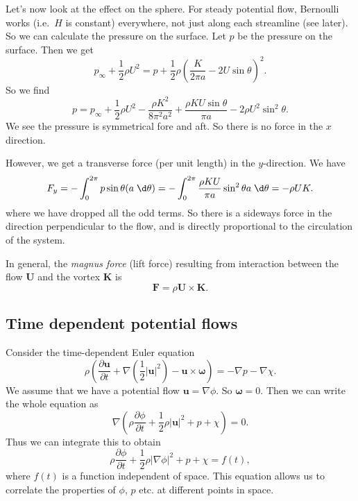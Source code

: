 \documentclass[a4paper]{article}
\begin{document}
\begin{eg}
\begin{center}
  \end{center}
  Let's now look at the effect on the sphere. For steady potential flow, Bernoulli works (i.e.\ $H$ is constant) everywhere, not just along each streamline (see later). So we can calculate the pressure on the surface. Let $p$ be the pressure on the surface. Then we get
  \[
    p_\infty + \frac{1}{2} \rho U^2 = p + \frac{1}{2} \rho \left(\frac{K}{2\pi a} - 2U \sin \theta\right)^2.
  \]
  So we find
  \[
    p = p_\infty + \frac{1}{2} \rho U^2 - \frac{\rho K^2}{8 \pi^2 a^2} + \frac{\rho KU \sin \theta}{\pi a} - 2\rho U^2 \sin^2 \theta.
  \]
  We see the pressure is symmetrical fore and aft. So there is no force in the $x$ direction.

  However, we get a transverse force (per unit length) in the $y$-direction. We have
  \[
    F_y = -\int_0^{2\pi} p \sin \theta (a \;\d \theta) = -\int_0^{2\pi} \frac{\rho K U}{\pi a} \sin^2 \theta a \;\d \theta = - \rho UK.
  \]
  where we have dropped all the odd terms. So there is a sideways force in the direction perpendicular to the flow, and is directly proportional to the circulation of the system.

  In general, the \emph{magnus force} (lift force) resulting from interaction between the flow $\mathbf{U}$ and the vortex $\mathbf{K}$ is
  \[
    \mathbf{F} = \rho \mathbf{U}\times \mathbf{K}.
  \]
\end{eg}
\subsection{Time dependent potential flows}
Consider the time-dependent Euler equation
\[
  \rho\left(\frac{\partial \mathbf{u}}{\partial t} + \nabla\left(\frac{1}{2}|\mathbf{u}|^2\right) - \mathbf{u}\times \boldsymbol\omega\right) = -\nabla p - \nabla \chi.
\]
We assume that we have a potential flow $\mathbf{u} = \nabla \phi$. So $\boldsymbol\omega = 0$. Then we can write the whole equation as
\[
  \nabla \left(\rho \frac{\partial \phi}{\partial t} + \frac{1}{2} \rho |\mathbf{u}|^2 + p + \chi\right) = 0.
\]
Thus we can integrate this to obtain
\[
  \rho \frac{\partial\phi}{\partial t} + \frac{1}{2} \rho |\nabla \phi|^2 + p + \chi = f(t),
\]
where $f(t)$ is a function independent of space. This equation allows us to correlate the properties of $\phi$, $p$ etc. at different points in space.
\end{document}
